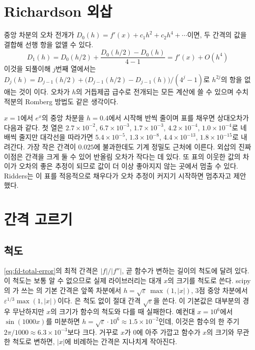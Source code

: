 \section{Richardson 외삽}
\label{sec:richardson}

중앙 차분의 오차 전개가 $D_0(h)=f'(x)+c_1h^2+c_2h^4+\cdots$이면, 두 간격의 값을 결합해 선행 항을 없앨 수 있다.
\[
D_1(h)=D_0(h/2)+\frac{D_0(h/2)-D_0(h)}{4-1}=f'(x)+O(h^4)
\]
이것을 되풀이해 $j$번째 열에서는 $D_j(h)=D_{j-1}(h/2)+\bigl(D_{j-1}(h/2)-D_{j-1}(h)\bigr)/(4^j-1)$로 $h^{2j}$의 항을 없애는 것이 이다\cite{richardson1911,richardson1927}. 오차가 $h$의 거듭제곱 급수로 전개되는 모든 계산에 쓸 수 있으며 수치 적분의 Romberg 방법도 같은 생각이다.

$x=1$에서 $e^x$의 중앙 차분을 $h=0.4$에서 시작해 반씩 줄이며 표를 채우면 상대오차가 다음과 같다. 첫 열은 $2.7\times10^{-2}$, $6.7\times10^{-3}$, $1.7\times10^{-3}$, $4.2\times10^{-4}$, $1.0\times10^{-4}$로 네 배씩 줄지만 대각선을 따라가면 $5.4\times10^{-5}$, $1.3\times10^{-8}$, $4.4\times10^{-13}$, $1.8\times10^{-15}$로 내려간다. 가장 작은 간격이 $0.025$에 불과한데도 기계 정밀도 근처에 이른다. 외삽의 진짜 이점은 간격을 크게 둘 수 있어 반올림 오차가 작다는 데 있다. 또 표의 이웃한 값의 차이가 오차의 좋은 추정이 되므로 값이 더 이상 좋아지지 않는 곳에서 멈출 수 있다. Ridders는 이 표를 적응적으로 채우다가 오차 추정이 커지기 시작하면 멈추자고 제안했다\cite{ridders1982}.

\section{간격 고르기}
\label{sec:step-choice}

\subsection{척도}

\eqref{eq:fd-total-error}의 최적 간격은 $|f|/|f''|$, 곧 함수가 변하는 길이의 척도에 달려 있다. 이 척도는 보통 알 수 없으므로 실제 라이브러리는 대개 $x$의 크기를 척도로 쓴다. scipy의 가 쓰는 의 기본 간격은 앞쪽 차분에서 $h=\sqrt\varepsilon\,\max(1,|x|)$, 3점 중앙 차분에서 $\varepsilon^{1/3}\max(1,|x|)$이다. 은 척도 없이 절대 간격 $\sqrt\varepsilon$을 쓴다. 이 기본값은 대부분의 경우 무난하지만 $x$의 크기가 함수의 척도와 다를 때 실패한다. 예컨대 $x=10^6$에서 $\sin(1000x)$를 미분하면 $h=\sqrt\varepsilon\cdot10^6\approx1.5\times10^{-2}$인데, 이것은 함수의 한 주기 $2\pi/1000\approx6.3\times10^{-3}$보다 크다. 거꾸로 $x$가 $0$에 아주 가깝고 함수가 $x$의 크기와 무관한 척도로 변하면, $|x|$에 비례하는 간격은 지나치게 작아진다.

